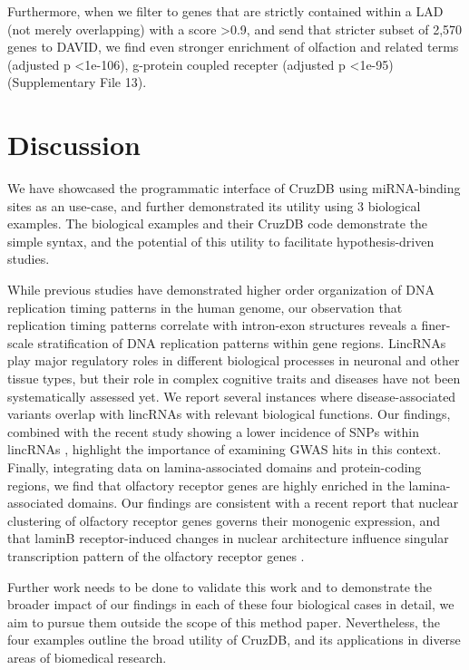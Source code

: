 \documentclass{bioinfo}
\begin{document}
Furthermore, when we filter to genes that are strictly contained within a LAD (not merely overlapping) with a score \textgreater 0.9, and send that stricter subset of 2,570 genes to DAVID, we find even stronger enrichment of olfaction and related terms (adjusted p \textless  1e-106), g-protein coupled recepter (adjusted p \textless  1e-95) (Supplementary File 13).




\section{Discussion}

We have showcased the programmatic interface of CruzDB using miRNA-binding sites as an use-case, and further demonstrated its utility using 3 biological examples.
The biological examples and their CruzDB code demonstrate the simple syntax, and the potential of this utility to facilitate hypothesis-driven studies.

While previous studies have demonstrated higher order organization of DNA replication timing patterns in the human genome, our observation that replication timing patterns correlate with intron-exon structures reveals a finer-scale stratification of DNA replication patterns within gene regions. LincRNAs play major regulatory roles in different biological processes in neuronal and other tissue types, but their role in complex cognitive traits and diseases have not been systematically assessed yet. We report several instances where disease-associated variants overlap with lincRNAs with relevant biological functions. Our findings, combined with the recent study showing a lower incidence of SNPs within lincRNAs \citep{Chen}, highlight the importance of examining GWAS hits in this context. Finally, integrating data on lamina-associated domains and protein-coding regions, we find that olfactory receptor genes are highly enriched in the lamina-associated domains. Our findings are consistent with a recent report that nuclear clustering of olfactory receptor genes governs their monogenic expression, and that laminB receptor-induced changes in nuclear architecture influence singular transcription pattern of the olfactory receptor genes \citep{Clowney}. 

Further work needs to be done to validate this work and to demonstrate the broader impact of our findings in each of these four biological cases in detail, we aim to pursue them outside the scope of this method paper. Nevertheless, the four examples outline the broad utility of CruzDB, and its applications in diverse areas of biomedical research.
\end{document}
